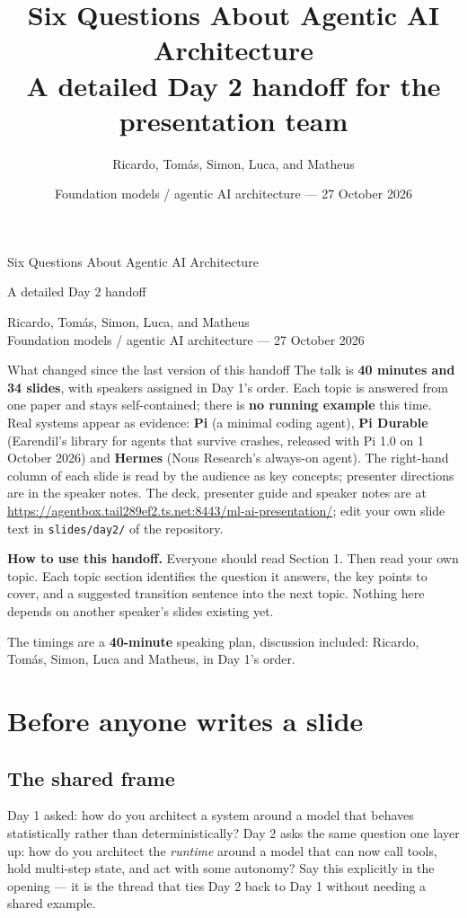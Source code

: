\documentclass[12pt,a4paper]{article}
\begin{document}
\RaggedRight
\title{Six Questions About Agentic AI Architecture\\[0.4em]\large A detailed Day 2 handoff for the presentation team}
\author{Ricardo, Tom\'as, Simon, Luca, and Matheus}
\date{Foundation models / agentic AI architecture --- 27 October 2026}
\begin{center}
{\LARGE Six Questions About Agentic AI Architecture\par}
{\large A detailed Day 2 handoff\par}
Ricardo, Tom\'as, Simon, Luca, and Matheus\\
Foundation models / agentic AI architecture --- 27 October 2026
\end{center}

\begin{keybox}{What changed since the last version of this handoff}
The talk is \textbf{40 minutes and 34 slides}, with speakers assigned in Day 1's order. Each topic is answered from one paper and stays self-contained; there is \textbf{no running example} this time. Real systems appear as evidence: \textbf{Pi} (a minimal coding agent), \textbf{Pi Durable} (Earendil's library for agents that survive crashes, released with Pi 1.0 on 1 October 2026) and \textbf{Hermes} (Nous Research's always-on agent). The right-hand column of each slide is read by the audience as key concepts; presenter directions are in the speaker notes. The deck, presenter guide and speaker notes are at \url{https://agentbox.tail289ef2.ts.net:8443/ml-ai-presentation/}; edit your own slide text in \texttt{slides/day2/} of the repository.
\end{keybox}

\textbf{How to use this handoff.} Everyone should read Section 1. Then read your own topic. Each topic section identifies the question it answers, the key points to cover, and a suggested transition sentence into the next topic. Nothing here depends on another speaker's slides existing yet.

The timings are a \textbf{40-minute} speaking plan, discussion included: Ricardo, Tom\'as, Simon, Luca and Matheus, in Day 1's order.

\section{Before anyone writes a slide}
\subsection{The shared frame}
Day 1 asked: how do you architect a system around a model that behaves statistically rather than deterministically? Day 2 asks the same question one layer up: how do you architect the \emph{runtime} around a model that can now call tools, hold multi-step state, and act with some autonomy? Say this explicitly in the opening --- it is the thread that ties Day 2 back to Day 1 without needing a shared example.
\end{document}

